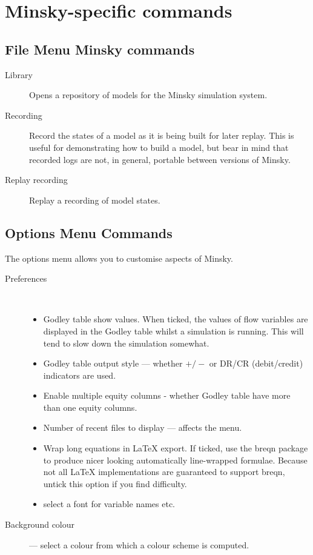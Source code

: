 \section{Minsky-specific commands}

\subsection{File Menu Minsky commands}
\begin{description}
\item [{Library}] Opens a repository of models for the Minsky simulation
system.
\item [{Recording}] Record the states of a model as it is being built for
later replay. This is useful for demonstrating how to build a model,
but bear in mind that recorded logs are not, in general, portable
between versions of Minsky.
\item [{Replay recording}] Replay a recording of model states.
\end{description}

\subsection{Options Menu Commands}

The options menu allows you to customise aspects of Minsky.
\begin{description}
\item [{Preferences}]~
\begin{itemize}
\item Godley table show values. When ticked, the values of flow variables
are displayed in the Godley table whilst a simulation is running.
This will tend to slow down the simulation somewhat. 
\item Godley table output style --- whether $+/-$ or DR/CR (debit/credit)
indicators are used. 
\item Enable multiple equity columns - whether Godley table have more than
one equity columns. 
\item Number of recent files to display --- affects the  menu. 
\item \label{wrap-equations-1} Wrap long equations in LaTeX export. If
ticked, use the breqn package to produce nicer looking automatically
line-wrapped formulae. Because not all LaTeX implementations are guaranteed
to support breqn, untick this option if you find difficulty. 
\item \label{font-1} select a font for variable names etc. 
\end{itemize}
\item [{Background colour}] --- select a colour from which a colour scheme
is computed.
\end{description}

